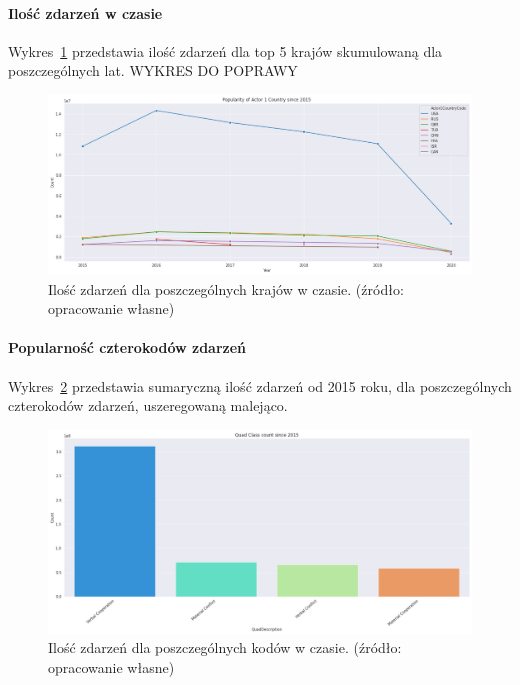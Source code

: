 \documentclass[11pt]{report}
\begin{document}
    \paragraph{Ilość zdarzeń w czasie}
    Wykres~\ref{fig:GLOBALactor1inTime} przedstawia ilość zdarzeń dla top 5 krajów skumulowaną dla poszczególnych lat.
    WYKRES DO POPRAWY
    \begin{figure}[ht!]
        \centering
        \includegraphics[width=1 \textwidth]{fig/GLOBAL/Actor1inTIME.png}
        \caption{Ilość zdarzeń dla poszczególnych krajów w czasie. (źródło: opracowanie własne)}
        \label{fig:GLOBALactor1inTime}
    \end{figure}

    \paragraph{Popularność czterokodów zdarzeń}
    Wykres~\ref{fig:GLOBALQC} przedstawia sumaryczną ilość zdarzeń od 2015 roku, dla poszczególnych czterokodów zdarzeń, uszeregowaną malejąco.
    \begin{figure}[ht!]
        \centering
        \includegraphics[width=1 \textwidth]{fig/GLOBAL/QC.png}
        \caption{Ilość zdarzeń dla poszczególnych kodów w czasie. (źródło: opracowanie własne)}
        \label{fig:GLOBALQC}
    \end{figure}
\end{document}
